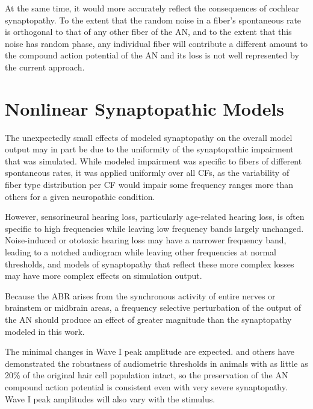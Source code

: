 At the same time, it would more accurately reflect the consequences of cochlear synaptopathy.  To the extent that the random noise in a fiber's spontaneous rate is orthogonal to that of any other fiber of the AN, and to the extent that this noise has random phase, any individual fiber will contribute a different amount to the compound action potential of the AN and its loss is not well represented by the current approach.  

\section{Nonlinear Synaptopathic Models} %
\label{sec:nonlinear_synaptopathic_models}
The unexpectedly small effects of modeled synaptopathy on the overall model output may in part be due to the uniformity of the synaptopathic impairment that was simulated.  While modeled impairment was specific to fibers of different spontaneous rates, it was applied uniformly over all CFs, as the variability of fiber type distribution per CF would impair some frequency ranges more than others for a given neuropathic condition. 

However, sensorineural hearing loss, particularly age-related hearing loss, is often specific to high frequencies while leaving low frequency bands largely unchanged.   Noise-induced or ototoxic hearing loss may have a narrower frequency band, leading to a notched audiogram while leaving other frequencies at normal thresholds, and models of synaptopathy that reflect these more complex losses may have more complex effects on simulation output.

Because the ABR arises from the synchronous activity of entire nerves or brainstem or midbrain areas, a frequency selective perturbation of the output of the AN should produce an effect of greater magnitude than the synaptopathy modeled in this work. 

The minimal changes in Wave I peak amplitude are expected.
\citeauthor{Liberman2014Efferent} and others have demonstrated the robustness of audiometric thresholds in animals with as little as 20\% of the original hair cell population intact, so the preservation of the AN compound action potential is consistent even with very severe synaptopathy.  Wave I peak amplitudes will also vary with the stimulus.  
